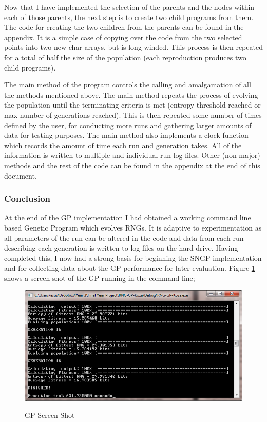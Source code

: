 \documentclass[a4paper,10.5pt]{article}
\begin{document}
Now that I have implemented the selection of the parents and the nodes within each of those parents, the next step is to create two child programs from them.
The code for creating the two children from the parents can be found in the appendix. It is a simple case of copying over the code from the two selected points into two new char arrays, but is long winded. This process is then repeated for a total of half the size of the population (each reproduction produces two child programs).

The main method of the program controls the calling and amalgamation of all the methods mentioned above. The main method repeats the process of evolving the population until the terminating criteria is met (entropy threshold reached or max number of generations reached). This is then repeated some number of times defined by the user, for conducting more runs and gathering larger amounts of data for testing purposes. The main method also implements a clock function which records the amount of time each run and generation takes. All of the information is written to multiple and individual run log files. Other (non major) methods and the rest of the code can be found in the appendix at the end of this document. 



\subsubsection{Conclusion}
At the end of the GP implementation I had obtained a working command line based Genetic Program which evolves RNGs. It is adaptive to experimentation as all parameters of the run can be altered in the code and data from each run describing each generation is written to log files on the hard drive. Having completed this, I now had a strong basis for beginning the SNGP implementation and for collecting data about the GP performance for later evaluation. Figure \ref{gpss} shows a screen shot of the GP running in the command line;

\begin{figure}[H]
\centering
\caption{GP Screen Shot}
\includegraphics[scale = 0.75]{gp-ss.png}
\label{gpss}
\end{figure}
\end{document}
